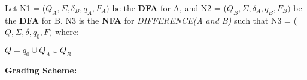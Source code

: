 \documentclass[11pt, article, oneside]{memoir}
\begin{document}
\begin{enumerate}
        Let N1 = (\(Q_A, \Sigma, \delta_B, q_A, F_A)\) be the \textbf{DFA} for A, and N2 = (\(Q_B, \Sigma, \delta_A, q_B, F_B)\) be the \textbf{DFA} for B. N3 is the \textbf{NFA} for \textit{DIFFERENCE(A and B)} such that N3 = (\(Q, \Sigma, \delta, q_0, F)\) where:

        \(Q = q_0 \cup Q_A \cup Q_B \)

        \textbf{Grading Scheme:}
\end{enumerate}















\end{document}
